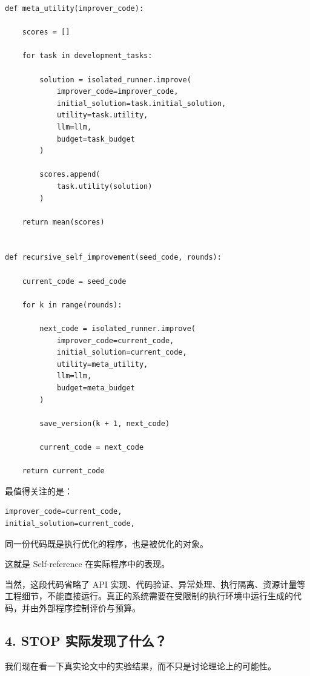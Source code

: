\begin{verbatim}
def meta_utility(improver_code):

    scores = []

    for task in development_tasks:

        solution = isolated_runner.improve(
            improver_code=improver_code,
            initial_solution=task.initial_solution,
            utility=task.utility,
            llm=llm,
            budget=task_budget
        )

        scores.append(
            task.utility(solution)
        )

    return mean(scores)


def recursive_self_improvement(seed_code, rounds):

    current_code = seed_code

    for k in range(rounds):

        next_code = isolated_runner.improve(
            improver_code=current_code,
            initial_solution=current_code,
            utility=meta_utility,
            llm=llm,
            budget=meta_budget
        )

        save_version(k + 1, next_code)

        current_code = next_code

    return current_code
\end{verbatim}

最值得关注的是：

\begin{verbatim}
improver_code=current_code,
initial_solution=current_code,
\end{verbatim}

同一份代码既是执行优化的程序，也是被优化的对象。

这就是 Self-reference 在实际程序中的表现。

当然，这段代码省略了 API 实现、代码验证、异常处理、执行隔离、资源计量等工程细节，不能直接运行。真正的系统需要在受限制的执行环境中运行生成的代码，并由外部程序控制评价与预算。

\hypertarget{part-3-37-0001-stop-ux5b9eux9645ux53d1ux73b0ux4e86ux4ec0ux4e48}{%
\subsection{4. STOP 实际发现了什么？}\label{part-3-37-0001-stop-ux5b9eux9645ux53d1ux73b0ux4e86ux4ec0ux4e48}}

我们现在看一下真实论文中的实验结果，而不只是讨论理论上的可能性。

